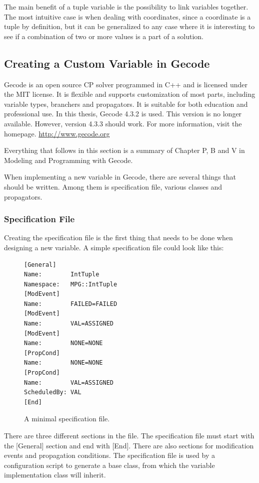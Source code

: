 \documentclass[a4paper,11pt]{article}
\begin{document}
The main benefit of a tuple variable is the possibility to link variables together. The most intuitive case is when dealing with coordinates, since a coordinate is a tuple by definition, but it can be generalized to any case where it is interesting to see if a combination of two or more values is a part of a solution. 

\subsection{Creating a Custom Variable in Gecode}
Gecode is an open source CP solver programmed in C++ and is licensed under the MIT license. It is flexible and supports customization of most parts, including variable types, branchers and propagators. It is suitable for both education and professional use. In this thesis, Gecode 4.3.2 is used. This version is no longer available. However, version 4.3.3 should work. For more information, visit the homepage. \url{http://www.gecode.org}

Everything that follows in this section is a summary of Chapter P, B and V in Modeling and Programming with Gecode\cite{mpg}. 

When implementing a new variable in Gecode, there are several things that should be written. Among them is specification file, various classes and propagators.
\subsubsection{Specification File}\label{sec:specfile}
Creating the specification file is the first thing that needs to be done when designing a new variable.  A simple specification file could look like this:

\begin{figure}
\begin{minipage}{\linewidth}
\begin{lstlisting}[frame=single]
[General]
Name:        IntTuple
Namespace:   MPG::IntTuple
[ModEvent]
Name:        FAILED=FAILED
[ModEvent]
Name:        VAL=ASSIGNED
[ModEvent]
Name:        NONE=NONE
[PropCond]
Name:        NONE=NONE
[PropCond]
Name:        VAL=ASSIGNED
ScheduledBy: VAL
[End]
\end{lstlisting}
\end{minipage}
\caption{A minimal specification file.}
\end{figure}

There are three different sections in the file. The specification file must start with the [General] section and end with [End]. There are also sections for modification events and propagation conditions. The specification file is used by a configuration script to generate a base class, from which the variable implementation class will inherit.
\end{document}
